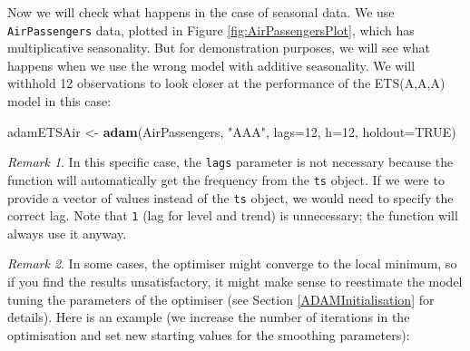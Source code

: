\documentclass[]{book}
\newenvironment{Shaded}{\begin{snugshade}}{\end{snugshade}}
\newcommand{\DataTypeTok}[1]{\textcolor[rgb]{0.13,0.29,0.53}{#1}}
\newcommand{\DecValTok}[1]{\textcolor[rgb]{0.00,0.00,0.81}{#1}}
\newcommand{\FloatTok}[1]{\textcolor[rgb]{0.00,0.00,0.81}{#1}}
\newcommand{\KeywordTok}[1]{\textcolor[rgb]{0.13,0.29,0.53}{\textbf{#1}}}
\newcommand{\NormalTok}[1]{#1}
\newcommand{\OperatorTok}[1]{\textcolor[rgb]{0.81,0.36,0.00}{\textbf{#1}}}
\newcommand{\OtherTok}[1]{\textcolor[rgb]{0.56,0.35,0.01}{#1}}
\newcommand{\StringTok}[1]{\textcolor[rgb]{0.31,0.60,0.02}{#1}}
\theoremstyle{definition}
\theoremstyle{definition}
\theoremstyle{definition}
\theoremstyle{definition}
\theoremstyle{remark}
\newtheorem*{remark}{Remark}
\begin{document}
Now we will check what happens in the case of seasonal data. We use \texttt{AirPassengers} data, plotted in Figure \ref{fig:AirPassengersPlot}, which has multiplicative seasonality. But for demonstration purposes, we will see what happens when we use the wrong model with additive seasonality. We will withhold 12 observations to look closer at the performance of the ETS(A,A,A) model in this case:

\begin{Shaded}
\begin{Highlighting}[]
\NormalTok{adamETSAir <-}\StringTok{ }\KeywordTok{adam}\NormalTok{(AirPassengers, }\StringTok{"AAA"}\NormalTok{, }\DataTypeTok{lags=}\DecValTok{12}\NormalTok{,}
                   \DataTypeTok{h=}\DecValTok{12}\NormalTok{, }\DataTypeTok{holdout=}\OtherTok{TRUE}\NormalTok{)}
\end{Highlighting}
\end{Shaded}

\begin{remark}
In this specific case, the \texttt{lags} parameter is not necessary because the function will automatically get the frequency from the \texttt{ts} object. If we were to provide a vector of values instead of the \texttt{ts} object, we would need to specify the correct lag. Note that \texttt{1} (lag for level and trend) is unnecessary; the function will always use it anyway.
\end{remark}

\begin{remark}
In some cases, the optimiser might converge to the local minimum, so if you find the results unsatisfactory, it might make sense to reestimate the model tuning the parameters of the optimiser (see Section \ref{ADAMInitialisation} for details). Here is an example (we increase the number of iterations in the optimisation and set new starting values for the smoothing parameters):
\end{remark}

\begin{Shaded}
\end{Shaded}
\end{document}
